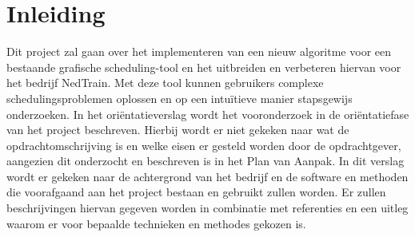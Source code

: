 \section{Inleiding}
Dit project zal gaan over het implementeren van een nieuw algoritme voor een bestaande grafische scheduling-tool en het uitbreiden en verbeteren hiervan voor het bedrijf NedTrain. Met deze tool kunnen gebruikers complexe schedulingsproblemen oplossen en op een intu\"itieve manier stapsgewijs onderzoeken. In het ori\"entatieverslag wordt het vooronderzoek in de ori\"entatiefase van het project beschreven. Hierbij wordt er niet gekeken naar wat de opdrachtomschrijving is en welke eisen er gesteld worden door de opdrachtgever, aangezien dit onderzocht en beschreven is in het Plan van Aanpak. In dit verslag wordt er gekeken naar de achtergrond van het bedrijf en de software en methoden die voorafgaand aan het project bestaan en gebruikt zullen worden. Er zullen beschrijvingen hiervan gegeven worden in combinatie met referenties en een uitleg waarom er voor bepaalde technieken en methodes gekozen is.

